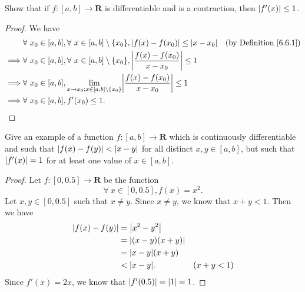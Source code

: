 \begin{exercise}\label{ex 6.6.2}
    Show that if \(f : [a, b] \to \mathbf{R}\) is differentiable and is a contraction, then \(\abs*{f'(x)} \leq 1\).
\end{exercise}

\begin{proof}
    We have
    \begin{align*}
                 & \forall\ x_0 \in [a, b], \forall\ x \in [a, b] \setminus \{x_0\}, \abs*{f(x) - f(x_0)} \leq \abs*{x - x_0}             & \text{(by Definition \ref{6.6.1})} \\
        \implies & \forall\ x_0 \in [a, b], \forall\ x \in [a, b] \setminus \{x_0\}, \abs*{\frac{f(x) - f(x_0)}{x - x_0}} \leq 1                                               \\
        \implies & \forall\ x_0 \in [a, b], \lim_{x \to x_0 ; x \in [a, b] \setminus \{x_0\}} \abs*{\frac{f(x) - f(x_0)}{x - x_0}} \leq 1                                      \\
        \implies & \forall\ x_0 \in [a, b], f'(x_0) \leq 1.
    \end{align*}
\end{proof}

\begin{exercise}\label{ex 6.6.3}
    Give an example of a function \(f : [a, b] \to \mathbf{R}\) which is continuously differentiable and such that \(\abs*{f(x) - f(y)} < \abs*{x - y}\) for all distinct \(x, y \in [a, b]\), but such that \(\abs*{f'(x)} = 1\) for at least one value of \(x \in [a, b]\).
\end{exercise}

\begin{proof}
    Let \(f : [0, 0.5] \to \mathbf{R}\) be the function
    \[
        \forall\ x \in [0, 0.5], f(x) = x^2.
    \]
    Let \(x, y \in [0, 0.5]\) such that \(x \neq y\).
    Since \(x \neq y\), we know that \(x + y < 1\).
    Then we have
    \begin{align*}
        \abs*{f(x) - f(y)} & = \abs*{x^2 - y^2}                    \\
                           & = \abs*{(x - y)(x + y)}               \\
                           & = \abs*{x - y} (x + y)                \\
                           & < \abs*{x - y}.         & (x + y < 1)
    \end{align*}
    Since \(f'(x) = 2x\), we know that \(\abs*{f'(0.5)} = \abs*{1} = 1\).
\end{proof}

